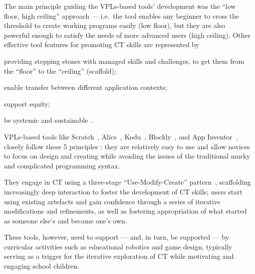 The main principle guiding the \acp{VPL}-based tools' development was the ``low floor, high ceiling'' approach --- i.e.\ the tool enables any beginner to cross the threshold to create working programs easily (low floor), but they are also powerful enough to satisfy the needs of more advanced users (high ceiling). Other effective tool features for promoting \ac{CT} skills are represented by
\begin{enumerate*}[label=(\arabic*)]
  \item providing stepping stones with managed skills and challenges, to get them from the ``floor'' to the ``ceiling'' (scaffold);
  \item enable transfer between different application contexts;
  \item support equity;
  \item be systemic and sustainable~\cite{Repenning:2010cz}.
\end{enumerate*}

\acp{VPL}-based tools like Scratch~\cite{Resnick:2009bd}, Alice~\cite{Herbert:2012}, Kodu~\cite{Fowler:2012}, Blockly~\cite{trower2015blockly}, and App Inventor~\cite{gray2012teaching}, closely follow these 5 principles : they are relatively easy to use and allow novices to focus on design and creating while avoiding the issues of the traditional murky and complicated programming syntax.

They engage in \ac{CT} using a three-stage ``Use-Modify-Create'' pattern~\cite{Lee:2011tm}, scaffolding increasingly deep interaction to foster the development of \ac{CT} skills; users start using existing artefacts and gain confidence through a series of iterative modifications and refinements, as well as fostering appropriation of what started as someone else's and became one's own.

These tools, however, need to support --- and, in turn, be supported --- by curricular activities such as educational robotics and game design, typically serving as a trigger for the iterative exploration of \ac{CT} while motivating and engaging school children.

